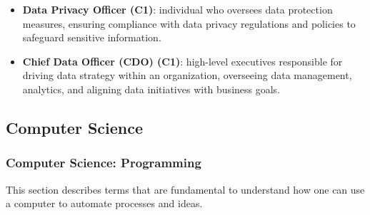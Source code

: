 \documentclass{article}
\begin{document}
\begin{itemize}
    \item \textbf{Data Privacy Officer (C1)}: individual who oversees data protection measures, ensuring compliance with data privacy regulations and policies to safeguard sensitive information.
    
    \item \textbf{Chief Data Officer (CDO) (C1)}: high-level executives responsible for driving data strategy within an organization, overseeing data management, analytics, and aligning data initiatives with business goals.
    

\end{itemize}


\subsection*{Computer Science}

\subsubsection*{Computer Science: Programming}

This section describes terms that are fundamental to understand how one can use a computer to automate processes and ideas.
\end{document}
